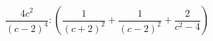 \begin{ex}[type=expression]
	\begin{condition}
		\( \dfrac{4c^2}{(c-2)^4} :\left( \dfrac{1}{(c+2)^2}+\dfrac{1}{(c-2)^2}+\dfrac{2}{c^2-4} \right)\)
	\end{condition}
\end{ex}